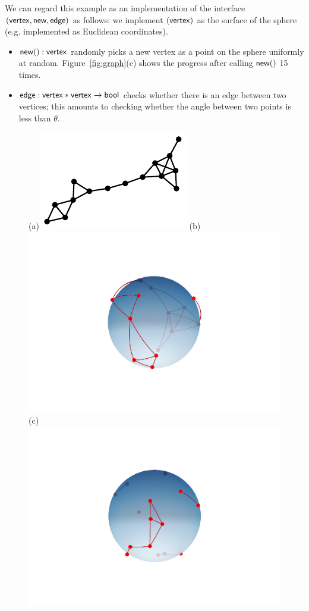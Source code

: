 We can regard this example as an implementation of the interface
$(\mathsf{vertex},\mathsf{new},\mathsf{edge})$ as follows:
we implement $(\mathsf{vertex})$ as the surface of the sphere (e.g. implemented
as Euclidean coordinates). 
\begin{itemize}
\item $\mathsf{new}():\mathsf{vertex}$ randomly picks a new vertex
  as a point on the sphere uniformly at random.
  Figure~\ref{fig:graph}(c) shows the progress after calling $\mathsf{new}()$ 15
  times.
\item $\mathsf{edge}:\mathsf{vertex}\ast \mathsf{vertex} \to \mathsf{bool}$ checks whether there
  is an edge between two vertices; this amounts to checking whether the angle between two points is less than $\theta$. 
  \end{itemize}
\begin{figure}\centering
(a)\includegraphics[scale=1,angle=110,valign=t]{graph-data.pdf} \quad (b)\includegraphics[scale=.5,valign=t]{random-geometric-graph-pi-3_1.pdf} \quad
(c)\includegraphics[scale=.5,valign=t]{random-geometric-graph-pi-6_1.pdf}

\end{figure}

